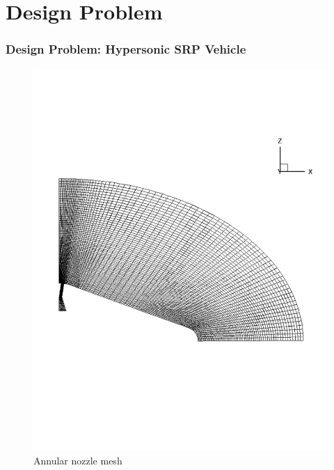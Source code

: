 \documentclass{beamer}
\begin{document}
\section{Design Problem}
\begin{frame}
  \frametitle{Design Problem: Hypersonic SRP Vehicle}
  \begin{figure}[ht]
     \begin{minipage}[b]{0.4\linewidth}
         \centering
         \includegraphics[scale=0.2,trim={0 8cm 0 8cm}]{figures/from_peter/annular_grid}
         \caption{Annular nozzle mesh}
         \label{fig:annular_grid}
     \end{minipage}
     \hspace{0.5cm}
     \begin{minipage}[b]{0.4\linewidth}
         \centering

\end{minipage}
\end{figure}
\end{frame}
\end{document}
